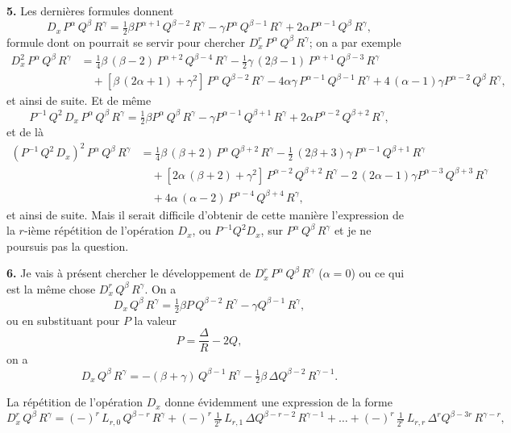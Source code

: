 \documentclass[11pt]{article}
\begin{document}
\textbf{5.} Les dernières formules donnent
\[
D_x\,P^{\alpha}\,Q^{\beta}\,R^{\gamma} = \tfrac{1}{2}\beta P^{\alpha+1}\,Q^{\beta-2}\,R^{\gamma} - \gamma P^{\alpha}\,Q^{\beta-1}\,R^{\gamma} + 2\alpha P^{\alpha-1}\,Q^{\beta}\,R^{\gamma},
\]
formule dont on pourrait se servir pour chercher $D_x^r\,P^{\alpha}\,Q^{\beta}\,R^{\gamma}$; on a par exemple
\begin{align*}
D_x^2\,P^{\alpha}\,Q^{\beta}\,R^{\gamma} &= \tfrac{1}{4}\beta\,(\beta-2)\,P^{\alpha+2}\,Q^{\beta-4}\,R^{\gamma} - \tfrac{1}{2}\gamma\,(2\beta-1)\,P^{\alpha+1}\,Q^{\beta-3}\,R^{\gamma}\\
&\quad + [\beta\,(2\alpha+1) + \gamma^2]\,P^{\alpha}\,Q^{\beta-2}\,R^{\gamma} - 4\alpha\gamma\,P^{\alpha-1}\,Q^{\beta-1}\,R^{\gamma} + 4\,(\alpha-1)\gamma P^{\alpha-2}\,Q^{\beta}\,R^{\gamma},
\end{align*}
et ainsi de suite. Et de même
\[
P^{-1}\,Q^2\,D_x\,P^{\alpha}\,Q^{\beta}\,R^{\gamma} = \tfrac{1}{2}\beta P^{\alpha}\,Q^{\beta}\,R^{\gamma} - \gamma P^{\alpha-1}\,Q^{\beta+1}\,R^{\gamma} + 2\alpha P^{\alpha-2}\,Q^{\beta+2}\,R^{\gamma},
\]
et de là
\begin{align*}
(P^{-1}\,Q^2\,D_x)^2\,P^{\alpha}\,Q^{\beta}\,R^{\gamma} &= \tfrac{1}{4}\beta\,(\beta+2)\,P^{\alpha}\,Q^{\beta+2}\,R^{\gamma} - \tfrac{1}{2}\,(2\beta+3)\gamma\,P^{\alpha-1}\,Q^{\beta+1}\,R^{\gamma}\\
&\quad + [2\alpha\,(\beta+2) + \gamma^2]\,P^{\alpha-2}\,Q^{\beta+2}\,R^{\gamma} - 2\,(2\alpha-1)\gamma P^{\alpha-3}\,Q^{\beta+3}\,R^{\gamma}\\
&\quad + 4\alpha\,(\alpha-2)\,P^{\alpha-4}\,Q^{\beta+4}\,R^{\gamma},
\end{align*}
et ainsi de suite. Mais il serait difficile d'obtenir de cette manière l'expression de la $r$-ième répétition de l'opération $D_x$, ou $P^{-1}Q^2 D_x$, sur $P^{\alpha}\,Q^{\beta}\,R^{\gamma}$ et je ne poursuis pas la question.

\medskip

\textbf{6.} Je vais à présent chercher le développement de $D_x^r\,P^{\alpha}\,Q^{\beta}\,R^{\gamma}$ ($\alpha = 0$) ou ce qui est la même chose $D_x^r\,Q^{\beta}\,R^{\gamma}$. On a
\[
D_x\,Q^{\beta}\,R^{\gamma} = \tfrac{1}{2}\beta P\,Q^{\beta-2}\,R^{\gamma} - \gamma Q^{\beta-1}\,R^{\gamma},
\]
ou en substituant pour $P$ la valeur
\[
P = \frac{\Delta}{R} - 2Q,
\]
on a
\[
D_x\,Q^{\beta}\,R^{\gamma} = -(\beta + \gamma)\,Q^{\beta-1}\,R^{\gamma} - \tfrac{1}{2}\beta\,\Delta Q^{\beta-2}\,R^{\gamma-1}.
\]

La répétition de l'opération $D_x$ donne évidemment une expression de la forme
\[
D_x^r\,Q^{\beta}\,R^{\gamma} = (-)^r\,L_{r,0}\,Q^{\beta-r}\,R^{\gamma} + (-)^{r}\,\tfrac{1}{2^r}\,L_{r,1}\,\Delta Q^{\beta-r-2}\,R^{\gamma-1} + \ldots + (-)^r\,\tfrac{1}{2^r}\,L_{r,r}\,\Delta^r Q^{\beta-3r}\,R^{\gamma-r},
\]
\end{document}
